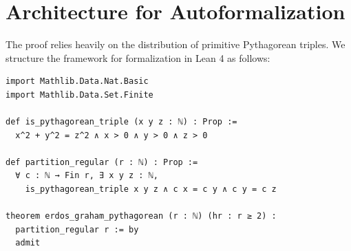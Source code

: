 \documentclass[12pt]{article}
\begin{document}
\section{Architecture for Autoformalization}
The proof relies heavily on the distribution of primitive Pythagorean triples. We structure the framework for formalization in Lean 4 as follows:

\begin{verbatim}
import Mathlib.Data.Nat.Basic
import Mathlib.Data.Set.Finite

def is_pythagorean_triple (x y z : ℕ) : Prop :=
  x^2 + y^2 = z^2 ∧ x > 0 ∧ y > 0 ∧ z > 0

def partition_regular (r : ℕ) : Prop :=
  ∀ c : ℕ → Fin r, ∃ x y z : ℕ,
    is_pythagorean_triple x y z ∧ c x = c y ∧ c y = c z

theorem erdos_graham_pythagorean (r : ℕ) (hr : r ≥ 2) :
  partition_regular r := by
  admit
\end{verbatim}
\end{document}
